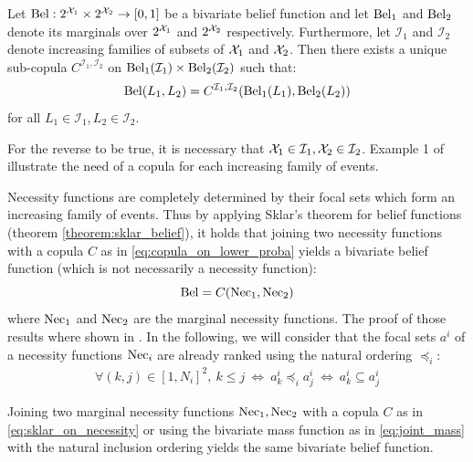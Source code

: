 \begin{theorem}\label{theorem:sklar_belief}
    Let ${\mathrm{Bel}} :2^{{\mathcal{X}}_1}\times2^{{\mathcal{X}}_2}\rightarrow[0,1]$ be a bivariate belief function and let ${\mathrm{Bel}}_1$ and ${\mathrm{Bel}}_2$ denote its marginals over $2^{{\mathcal{X}}_1}$ and $2^{{\mathcal{X}}_2}$ respectively. Furthermore, let $\mathcal{I}_1$ and $\mathcal{I}_2$ denote increasing families of subsets of ${\mathcal{X}}_1$ and ${\mathcal{X}}_2$. Then there exists a unique sub-copula $C^{\mathcal{I}_1,\mathcal{I}_2}$ on  ${\mathrm{Bel}}_1(\mathcal{I}_1)\times {\mathrm{Bel}}_2(\mathcal{I}_2)$ such that:
    \begin{eqnarray}
        {\mathrm{Bel}} (L_1, L_2) = C^{\mathcal{I}_1,\mathcal{I}_2}({\mathrm{Bel}}_1(L_1), {\mathrm{Bel}}_2(L_2))
    \end{eqnarray}
    for all $L_1\in\mathcal{I}_1,L_2\in\mathcal{I}_2$.
\end{theorem}
For the reverse to be true, it is necessary that ${\mathcal{X}}_1\in\mathcal{I}_1, {\mathcal{X}}_2\in\mathcal{I}_2$. Example 1 of \cite{schmelzer_joint_2015} illustrate the need of a copula for each increasing family of events.

Necessity functions are completely determined by their focal sets which form an increasing family of events. Thus by applying Sklar's theorem for belief functions (theorem \ref{theorem:sklar_belief}), it holds that joining two necessity functions with a copula $C$ as in \eqref{eq:copula_on_lower_proba} yields a bivariate belief function (which is not necessarily a necessity function):
\begin{equation}
    {\mathrm{Bel}} = C({\mathrm{Nec}}_1, {\mathrm{Nec}}_2)\label{eq:sklar_on_necessity}
\end{equation}
where ${\mathrm{Nec}}_1$ and ${\mathrm{Nec}}_2$ are the marginal necessity functions. The proof of those results where shown in \cite{schmelzer_joint_2015,schmelzer_sklars_2015}. In the following, we will consider that the focal sets $a^i$ of a necessity functions ${\mathrm{Nec}}_i$ are already ranked using the natural ordering $\preceq_i$:
\begin{eqnarray}
    \forall (k,j)\in[1, N_i]^2,~k\leqslant j ~\Leftrightarrow ~ a^i_k \preceq_i a^i_j ~\Leftrightarrow ~ a^i_k\subseteq a^i_j
\end{eqnarray}

\begin{proposition}\label{prop:sklar_necessity}
    Joining two marginal necessity functions ${\mathrm{Nec}}_1, {\mathrm{Nec}}_2$ with a copula $C$ as in \eqref{eq:sklar_on_necessity} or using the bivariate mass function as in \eqref{eq:joint_mass} with the natural inclusion ordering yields the same bivariate belief function.
\end{proposition}

